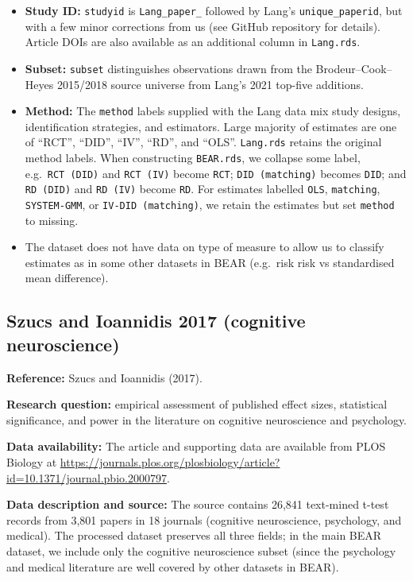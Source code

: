\documentclass[
  11pt,
]{article}
\providecommand{\tightlist}{%
  \setlength{\itemsep}{0pt}\setlength{\parskip}{0pt}}
\begin{document}
\begin{itemize}
\tightlist
\item
  \textbf{Study ID:} \texttt{studyid} is \texttt{Lang\_paper\_} followed
  by Lang's \texttt{unique\_paperid}, but with a few minor corrections
  from us (see GitHub repository for details). Article DOIs are also
  available as an additional column in \texttt{Lang.rds}.
\item
  \textbf{Subset:} \texttt{subset} distinguishes observations drawn from
  the Brodeur--Cook--Heyes 2015/2018 source universe from Lang's 2021
  top-five additions.
\item
  \textbf{Method:} The \texttt{method} labels supplied with the Lang
  data mix study designs, identification strategies, and estimators.
  Large majority of estimates are one of ``RCT'', ``DID'', ``IV'',
  ``RD'', and ``OLS''. \texttt{Lang.rds} retains the original method
  labels. When constructing \texttt{BEAR.rds}, we collapse some label,
  e.g.~\texttt{RCT\ (DID)} and \texttt{RCT\ (IV)} become \texttt{RCT};
  \texttt{DID\ (matching)} becomes \texttt{DID}; and \texttt{RD\ (DID)}
  and \texttt{RD\ (IV)} become \texttt{RD}. For estimates labelled
  \texttt{OLS}, \texttt{matching}, \texttt{SYSTEM-GMM}, or
  \texttt{IV-DID\ (matching)}, we retain the estimates but set
  \texttt{method} to missing.
\item
  The dataset does not have data on type of measure to allow us to
  classify estimates as in some other datasets in BEAR (e.g.~risk risk
  vs standardised mean difference).
\end{itemize}

\newpage

\subsection{Szucs and Ioannidis 2017 (cognitive
neuroscience)}\label{szucs-and-ioannidis-2017-cognitive-neuroscience}

\textbf{Reference:} Szucs and Ioannidis (2017).

\textbf{Research question:} empirical assessment of published effect
sizes, statistical significance, and power in the literature on
cognitive neuroscience and psychology.

\textbf{Data availability:} The article and supporting data are
available from PLOS Biology at
\url{https://journals.plos.org/plosbiology/article?id=10.1371/journal.pbio.2000797}.

\textbf{Data description and source:} The source contains 26,841
text-mined t-test records from 3,801 papers in 18 journals (cognitive
neuroscience, psychology, and medical). The processed dataset preserves
all three fields; in the main BEAR dataset, we include only the
cognitive neuroscience subset (since the psychology and medical
literature are well covered by other datasets in BEAR).
\end{document}
